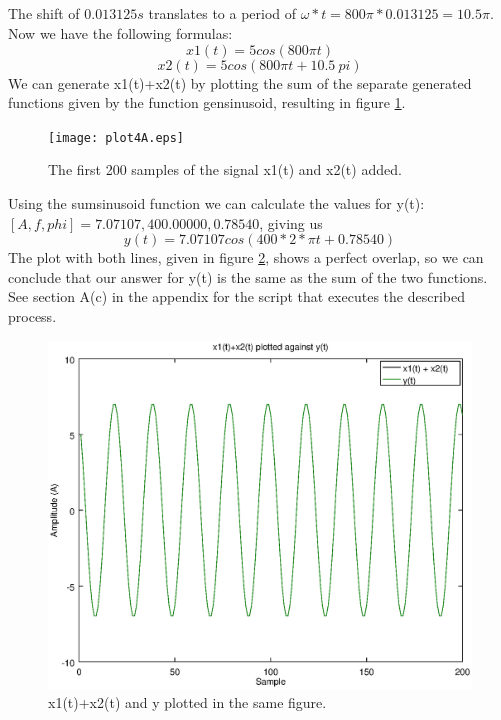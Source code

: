 \documentclass[10pt]{article}
\begin{document}
\subsection{}
The shift of $0.013125s$ translates to a period of $\omega * t = 800\pi*0.013125 = 10.5\pi$. Now we have the following formulas:
\begin{equation}
    x1(t) = 5 cos(800\pi t)
\end{equation}
\begin{equation}
    x2(t) = 5 cos(800\pi t + 10.5\:pi)
\end{equation}
We can generate x1(t)+x2(t) by plotting the sum of the separate generated functions given by the function gensinusoid, resulting in figure \ref{fig2d1}.\\
\begin{figure}[H]
  \centering
  \texttt{[image: plot4A.eps]}\\
  \caption{The first 200 samples of the signal x1(t) and x2(t) added.}
  \label{fig2d1}
\end{figure}
Using the sumsinusoid function we can calculate the values for y(t):
$[A, f, phi] = 7.07107,400.00000,0.78540$, giving us\
\begin{equation}
    y(t) = 7.07107 cos(400*2*\pi t + 0.78540)
\end{equation}
The plot with both lines, given in figure \ref{fig2d2}, shows a perfect overlap, so we can conclude that our answer for y(t) is the same as the sum of the two functions. See section A(c) in the appendix for the script that executes the described process.

\begin{figure}[H]
  \centering
  \includegraphics[width=\columnwidth]{plot4B.eps}
  \caption{x1(t)+x2(t) and y plotted in the same figure.}
  \label{fig2d2}
\end{figure}
\end{document}
